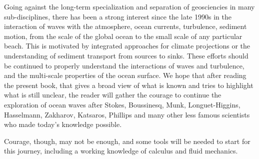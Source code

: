 Going against the long-term specialization and separation of geosciencies in many sub-disciplines, 
there has been a strong interest since the late 1990s in the interaction of waves with the atmosphere, ocean currents, 
turbulence, sediment motion, from the scale of the global ocean to the small scale of any particular beach. This is motivated by 
integrated approaches for climate projections or the understanding of sediment transport from sources to sinks. 
These efforts should be continued to properly understand the interactions of waves and turbulence, and the multi-scale 
properties of the ocean surface. 
We hope that after reading the present book, that gives a broad view of what is known and tries to highlight what is still unclear,
the reader will gather the courage to continue the exploration of ocean waves after Stokes, Boussinesq, Munk, Longuet-Higgins,
Hasselmann, Zakharov, Katsaros, Phillips and many other less famous scientists who made today's knowledge possible. 

Courage, though, may not be enough, and some tools will be needed to start for this journey, including 
a working knowledge of calculus and fluid mechanics. 

